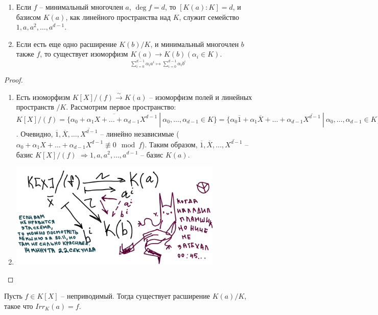 \documentclass[main]{subfiles}
\begin{document}

\begin{corollary}
    \begin{enumerate}
        \item Если $f$ -- минимальный многочлен $a$, $\deg f = d$, то $[K(a):K] = d$, и базисом $K(a)$, как линейного пространства над $K$, служит
    семейство $1, a, a^2, \ldots, a^{d-1}$.
        \item Если есть еще одно расширение $K(b)/K$, и минимальный многочлен $b$ также $f$, то существует изоморфизм
        $\underset{\sum_{i=0}^{d-1}\alpha_ia^i \mapsto \sum_{i=0}^{d-1}\alpha_ib^i}{K(a) \rightarrow K(b)} (\alpha_i \in K)$.
    \end{enumerate}
\end{corollary}

\begin{proof}
    \begin{enumerate}
    \item Есть изоморфизм $K[X]/(f) \xrightarrow{\sim } K(a)$ -- изоморфизм полей и линейных пространств $/K$. Рассмотрим первое пространство: 
    $K[X]/(f) = \{\overline{\alpha_0 + \alpha_1X + \ldots + \alpha_{d-1}X^{d-1}} \ | \ \alpha_0, \ldots, \alpha_{d-1} \in K\} = 
    \{\alpha_0\overline{1} + \alpha_1\overline{X} + \ldots + \alpha_{d-1}\overline{X^{d-1}} \ | \ \alpha_0, \ldots, \alpha_{d-1} \in K\}$.
    Очевидно, $\overline{1}, \overline{X}, \ldots, \overline{X^{d-1}}$ -- линейно независимые
    ($\alpha_0 + \alpha_1X + \ldots + \alpha_{d-1}X^{d-1} \not\equiv 0 \mod f$). Таким образом, 
    $\overline{1}, \overline{X}, \ldots, \overline{X^{d-1}}$ -- базис $K[X]/(f)$ 
    $\Rightarrow 1, a, a^2, \ldots, a^{d-1}$ -- базис $K(a)$.
    \item \includegraphics[width=0.8\textwidth]{ugly_scheme.jpg}
    \end{enumerate}
\end{proof}

\begin{proposition}
    Пусть $f \in K[X]$ -- неприводимый. Тогда существует расширение $K(a)/K$, такое что $Irr_K(a) = f$.
\end{proposition}
\end{document}
